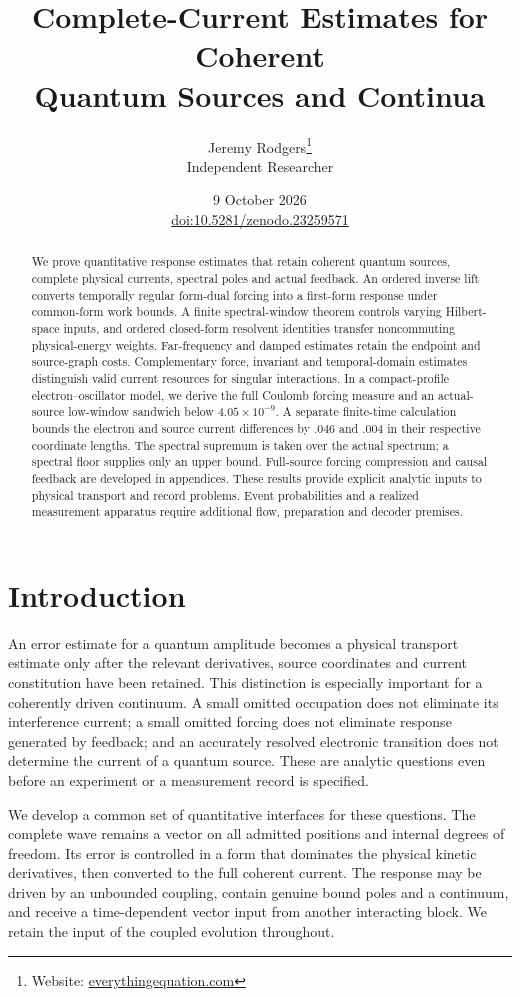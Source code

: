 \documentclass[11pt]{article}
\title{Complete-Current Estimates for Coherent\\Quantum Sources and Continua}
\author{Jeremy Rodgers\thanks{Website: \href{https://everythingequation.com}{everythingequation.com}}\\Independent Researcher}
\date{9 October 2026\\[3pt]
\small\href{https://doi.org/10.5281/zenodo.23259571}{doi:10.5281/zenodo.23259571}}
\numberwithin{equation}{section}
\theoremstyle{definition}
\theoremstyle{remark}
\begin{document}
\maketitle
\begin{abstract}
We prove quantitative response estimates that retain coherent quantum
sources, complete physical currents, spectral poles and actual feedback.
An ordered inverse lift converts temporally regular form-dual forcing
into a first-form response under common-form work bounds.
A finite spectral-window theorem controls varying Hilbert-space inputs,
and ordered closed-form resolvent identities transfer noncommuting
physical-energy weights. Far-frequency and damped estimates retain the
endpoint and source-graph costs. Complementary force, invariant and
temporal-domain estimates distinguish valid current resources for
singular interactions. In a compact-profile electron--oscillator model,
we derive the full Coulomb forcing measure and an actual-source
low-window sandwich below $4.05\times10^{-9}$. A separate finite-time
calculation bounds the electron and source current differences by
$.046$ and $.004$ in their respective coordinate lengths.
The spectral supremum is taken over the actual spectrum; a spectral
floor supplies only an upper bound. Full-source forcing compression
and causal feedback are developed in appendices.
These results provide explicit analytic inputs to physical transport
and record problems. Event probabilities and a realized measurement
apparatus require additional flow, preparation and decoder premises.
\end{abstract}
\clearpage
\tableofcontents
\newpage
\section{Introduction}
\label{p4s:sec:introduction}

An error estimate for a quantum amplitude becomes a physical transport
estimate only after the relevant derivatives, source coordinates and
current constitution have been retained. This distinction is especially
important for a coherently driven continuum. A small omitted occupation
does not eliminate its interference current; a small omitted forcing
does not eliminate response generated by feedback; and an accurately
resolved electronic transition does not determine the current of a
quantum source. These are analytic questions even before an experiment
or a measurement record is specified.

We develop a common set of quantitative interfaces for these questions.
The complete wave remains a vector on all admitted positions and
internal degrees of freedom. Its error is controlled in a form that
dominates the physical kinetic derivatives, then converted to the full
coherent current. The response may be driven by an unbounded coupling,
contain genuine bound poles and a continuum, and receive a
time-dependent vector input from another interacting block. We retain
the input of the coupled evolution throughout.
\end{document}
